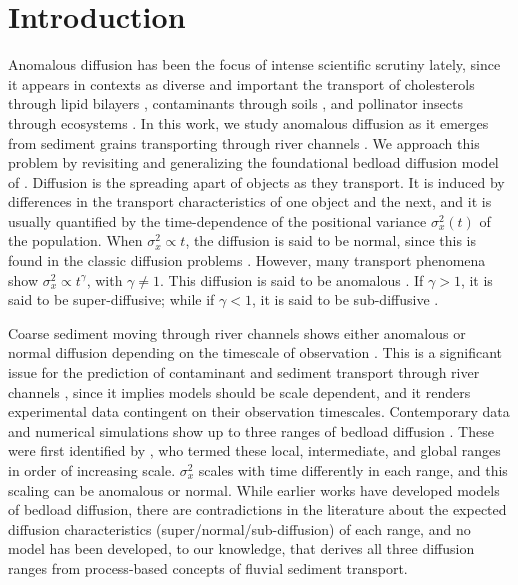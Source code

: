 \documentclass[]{agujournal2018}
\begin{document}
\section{Introduction}
Anomalous diffusion has been the focus of intense scientific scrutiny lately, since it appears in contexts as diverse and important the transport of cholesterols through lipid bilayers \citep{Jeon2012,Molina-Garcia2018}, contaminants through soils \citep{Berkowitz2006,Yang2019}, and pollinator insects through ecosystems \citep{Reynolds2009,Vallaeys2017}.
In this work, we study anomalous diffusion as it emerges from sediment grains transporting through river channels \citep{Martin2012,Bradley2017}.
We approach this problem by revisiting and generalizing the foundational bedload diffusion model of \citet{Einstein1937}.
Diffusion is the spreading apart of objects as they transport.
It is induced by differences in the transport characteristics of one object and the next, and it is usually quantified by the time-dependence of the positional variance $\sigma_x^2(t)$ of the population.
When $\sigma_x^2 \propto t$, the diffusion is said to be normal, since this is found in the classic diffusion problems \citep[e.g.][]{Einstein1905,Taylor1920}.
However, many transport phenomena show $\sigma_x^2 \propto t^\gamma$, with $\gamma \neq 1$. This diffusion is said to be anomalous \citep{Sokolov2012}.
If $\gamma>1$, it is said to be super-diffusive; while if $\gamma <1$, it is said to be sub-diffusive \citep{Metzler2000}.

Coarse sediment moving through river channels shows either anomalous or normal diffusion depending on the timescale of observation \citep{Nikora2002}.
This is a significant issue for the prediction of contaminant and sediment transport through river channels \citep{Macklin2006, Hassan2017}, since it implies models should be scale dependent, and it renders experimental data contingent on their observation timescales.
Contemporary data and numerical simulations show up to three ranges of bedload diffusion \citep{Martin2012, Bialik2012, Zhang2012, Fan2016, Bradley2017,Wu2019}.
These were first identified by \citet{Nikora2001a,Nikora2002}, who termed these local, intermediate, and global ranges in order of increasing scale.
$\sigma_x^2$ scales with time differently in each range, and this scaling can be anomalous or normal.
While earlier works have developed models of bedload diffusion, there are contradictions in the literature about the expected diffusion characteristics (super/normal/sub-diffusion) of each range, and no model has been developed, to our knowledge, that derives all three diffusion ranges from process-based concepts of fluvial sediment transport.
\end{document}

